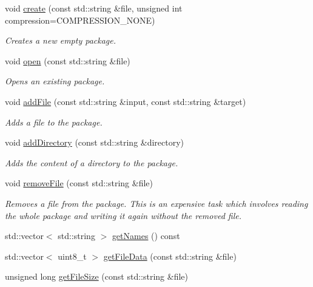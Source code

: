 \begin{DoxyCompactItemize}
\item 
void \hyperlink{classzt_1_1_package_a985b5fd2f225911709782ec42ea8dc48}{create} (const std\+::string \&file, unsigned int compression=C\+O\+M\+P\+R\+E\+S\+S\+I\+O\+N\+\_\+\+N\+O\+NE)
\begin{DoxyCompactList}\small\item\em Creates a new empty package. \end{DoxyCompactList}\item 
void \hyperlink{classzt_1_1_package_a30d7195cbd7b4856dda6207fd8ec785b}{open} (const std\+::string \&file)
\begin{DoxyCompactList}\small\item\em Opens an existing package. \end{DoxyCompactList}\item 
void \hyperlink{classzt_1_1_package_a5410213f58e0f08e648d6424474e0a5d}{add\+File} (const std\+::string \&input, const std\+::string \&target)
\begin{DoxyCompactList}\small\item\em Adds a file to the package. \end{DoxyCompactList}\item 
void \hyperlink{classzt_1_1_package_a6f528593a7a56b9d2c7ec6df0a6b2bb2}{add\+Directory} (const std\+::string \&directory)
\begin{DoxyCompactList}\small\item\em Adds the content of a directory to the package. \end{DoxyCompactList}\item 
void \hyperlink{classzt_1_1_package_af62e37955ffe46a4c37cd76c99405763}{remove\+File} (const std\+::string \&file)
\begin{DoxyCompactList}\small\item\em Removes a file from the package. This is an expensive task which involves reading the whole package and writing it again without the removed file. \end{DoxyCompactList}\item 
std\+::vector$<$ std\+::string $>$ \hyperlink{classzt_1_1_package_a9454a5a20192952e1d4d2c0ef9e434f4}{get\+Names} () const
\item 
std\+::vector$<$ uint8\+\_\+t $>$ \hyperlink{classzt_1_1_package_ab30b4acb16a680075b9d61de978181f4}{get\+File\+Data} (const std\+::string \&file)
\item 
unsigned long \hyperlink{classzt_1_1_package_a5c8234b81f3076072f5284a257bf0b51}{get\+File\+Size} (const std\+::string \&file)
\end{DoxyCompactItemize}
